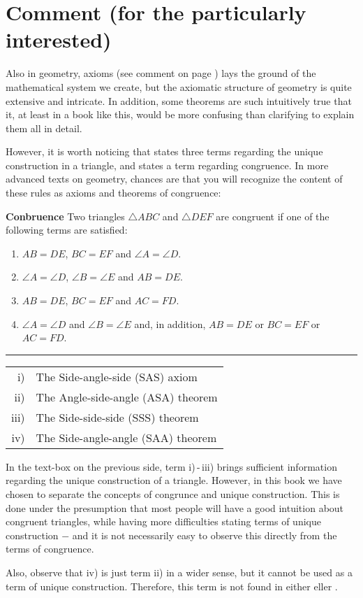 



\section*{Comment (for the particularly interested)}
Also in geometry, axioms (see comment on page \pageref{Kommentar1}) lays the ground of the mathematical system we create, but the axiomatic structure of geometry is quite extensive and intricate. In addition, some theorems are such intuitively true that it, at least in a book like this, would be more confusing than clarifying to explain them all in detail.\vsk

However, it is worth noticing that  states three terms regarding the unique construction in a triangle, and  states a term regarding congruence. In more advanced texts on geometry, chances are that you will recognize the content of these rules as axioms and theorems of congruence: \regv

\begin{tcolorbox}[boxrule=0.3 mm,arc=0mm,colback=blue!5] {\large \textbf{Conbruence} \vspace{5 pt}}\newline
	Two triangles $ \triangle ABC $ and $ \triangle DEF $ are congruent if one of the following terms are satisfied:
	\begin{enumerate}[label=\roman*)]
		\item $ AB=DE $, $ BC=EF $ and $ \angle A=\angle D $.
		\item $ \angle A=\angle D $, $ \angle B=\angle E $ and $ AB=DE $.
		\item $ AB=DE $, $ BC=EF $ and $ AC=FD $.
		\item $ {\angle A=\angle D} $ and $ {\angle B=\angle E} $ and, in addition, $ {AB=DE} $ or $ BC=EF $ or $ AC=FD $.
	\end{enumerate}
\rule{1\linewidth}{0.75bp}
\begin{center}
	\begin{tabular}{rl}
		i) &The Side-angle-side (SAS) axiom\\
		ii) &The Angle-side-angle (ASA) theorem\\
		iii) & The Side-side-side (SSS) theorem \\
		iv) & The Side-angle-angle (SAA) theorem 
	\end{tabular}
\end{center}
\end{tcolorbox}
\newpage
In the text-box on the previous side, term i)\,-\,iii) brings sufficient information regarding the unique construction of a triangle. However, in this book we have chosen to separate the concepts of congrunce and unique construction. This is done under the presumption that most people will have a good intuition about congruent triangles, while having more difficulties stating terms of unique construction $ - $  and it is not necessarily easy to observe this directly from the terms of congruence.\vsk

Also, observe that iv) is just term ii) in a wider sense, but it cannot be used as a term of unique construction. Therefore, this term is not found in either  eller .


